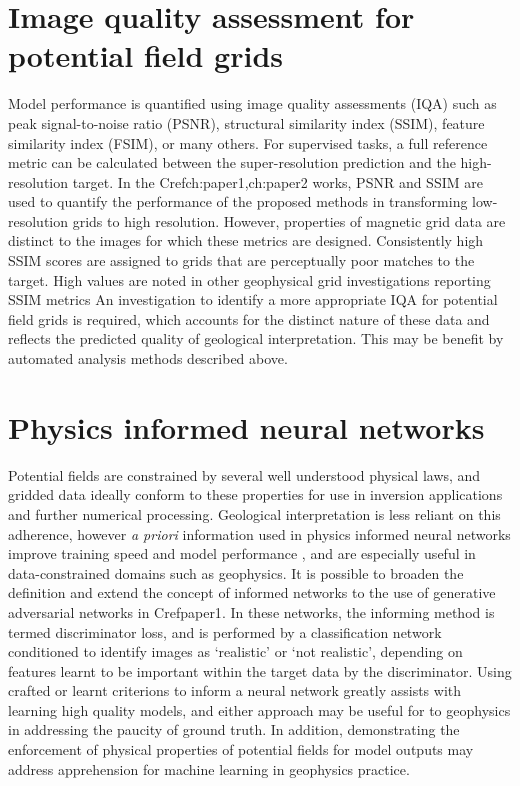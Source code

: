 \section{Image quality assessment for potential field grids}
Model performance is quantified using image quality assessments (IQA) such as peak signal-to-noise ratio (PSNR), structural similarity index (SSIM), feature similarity index (FSIM), or many others.
For supervised tasks, a full reference metric can be calculated between the super-resolution prediction and the high-resolution target.
In the Cref{ch:paper1,ch:paper2} works, PSNR and SSIM are used to quantify the performance of the proposed methods in transforming low-resolution grids to high resolution.
However, properties of magnetic grid data are distinct to the images for which these metrics are designed.
Consistently high SSIM scores are assigned to grids that are perceptually poor matches to the target.
High values are noted in other geophysical grid investigations reporting SSIM metrics \parencite{wangDeeplearningbasedSeismicData2018,bavandsavadkoohiHighresolutionAeromagneticMap2023}
An investigation to identify a more appropriate IQA for potential field grids is required, which accounts for the distinct nature of these data and reflects the predicted quality of geological interpretation.
This may be benefit by automated analysis methods described above.

\section{Physics informed neural networks}
Potential fields are constrained by several well understood physical laws, and gridded data ideally conform to these properties for use in inversion applications and further numerical processing.
Geological interpretation is less reliant on this adherence, however \emph{a priori} information used in physics informed neural networks improve training speed and model performance \parencite{raissiPhysicsinformedNeuralNetworks2019}, and are especially useful in data-constrained domains such as geophysics.
It is possible to broaden the definition and extend the concept of informed networks to the use of generative adversarial networks in Cref{paper1}.
In these networks, the informing method is termed discriminator loss, and is performed by a classification network conditioned to identify images as `realistic' or `not realistic', depending on features learnt to be important within the target data by the discriminator.
Using crafted or learnt criterions to inform a neural network greatly assists with learning high quality models, and either approach may be useful for to geophysics in addressing the paucity of ground truth.
In addition, demonstrating the enforcement of physical properties of potential fields for model outputs may address apprehension for machine learning in geophysics practice.

